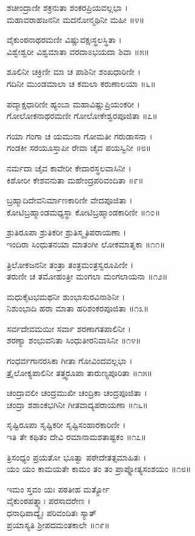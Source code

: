 ಶಚೀಂದ್ರಾಣೀ ಶಕ್ರನುತಾ ಶಂಕರಪ್ರಿಯವಲ್ಲಭಾ ।\\
ಮಹಾವರಾಹಜನನೀ ಮದನೋನ್ಮಥಿನೀ ಮಹೀ ॥೪॥

ವೈಕುಂಠನಾಥರಮಣೀ ವಿಷ್ಣುವಕ್ಷಃಸ್ಥಲಸ್ಥಿತಾ ।\\
ವಿಶ್ವೇಶ್ವರೀ ವಿಶ್ವಮಾತಾ ವರದಾಽಭಯದಾ ಶಿವಾ ॥೫॥

ಶೂಲಿನೀ ಚಕ್ರಿಣೀ ಮಾ ಚ ಪಾಶಿನೀ ಶಂಖಧಾರಿಣೀ ।\\
ಗದಿನೀ ಮುಂಡಮಾಲಾ ಚ ಕಮಲಾ ಕರುಣಾಲಯಾ ॥೬॥

ಪದ್ಮಾಕ್ಷಧಾರಿಣೀ ಹ್ಯಂಬಾ ಮಹಾವಿಷ್ಣುಪ್ರಿಯಂಕರೀ ।\\
ಗೋಲೋಕನಾಥರಮಣೀ ಗೋಲೋಕೇಶ್ವರಪೂಜಿತಾ ॥೭॥

ಗಯಾ ಗಂಗಾ ಚ ಯಮುನಾ ಗೋಮತೀ ಗರುಡಾಸನಾ ।\\
ಗಂಡಕೀ ಸರಯೂಸ್ತಾಪೀ ರೇವಾ ಚೈವ ಪಯಸ್ವಿನೀ ॥೮॥

ನರ್ಮದಾ ಚೈವ ಕಾವೇರೀ ಕೇದಾರಸ್ಥಲವಾಸಿನೀ ।\\
ಕಿಶೋರೀ ಕೇಶವನುತಾ ಮಹೇಂದ್ರಪರಿವಂದಿತಾ ॥೯॥

ಬ್ರಹ್ಮಾದಿದೇವನಿರ್ಮಾಣಕಾರಿಣೀ ವೇದಪೂಜಿತಾ ।\\
ಕೋಟಿಬ್ರಹ್ಮಾಂಡಮಧ್ಯಸ್ಥಾ ಕೋಟಿಬ್ರಹ್ಮಾಂಡಕಾರಿಣೀ ॥೧೦॥

ಶ್ರುತಿರೂಪಾ ಶ್ರುತಿಕರೀ ಶ್ರುತಿಸ್ಮೃತಿಪರಾಯಣಾ ।\\
ಇಂದಿರಾ ಸಿಂಧುತನಯಾ ಮಾತಂಗೀ ಲೋಕಮಾತೃಕಾ ॥೧೧॥

ತ್ರಿಲೋಕಜನನೀ ತಂತ್ರಾ ತಂತ್ರಮಂತ್ರಸ್ವರೂಪಿಣೀ ।\\
ತರುಣೀ ಚ ತಮೋಹಂತ್ರೀ ಮಂಗಲಾ ಮಂಗಲಾಯನಾ ॥೧೨॥

ಮಧುಕೈಟಭಮಥನೀ ಶುಂಭಾಸುರವಿನಾಶಿನೀ ।\\
ನಿಶುಂಭಾದಿ ಹರಾ ಮಾತಾ ಹರಿಶಂಕರಪೂಜಿತಾ ॥೧೩॥

ಸರ್ವದೇವಮಯೀ ಸರ್ವಾ ಶರಣಾಗತಪಾಲಿನೀ ।\\
ಶರಣ್ಯಾ ಶಂಭುವನಿತಾ ಸಿಂಧುತೀರನಿವಾಸಿನೀ ॥೧೪॥

ಗಂಧರ್ವಗಾನರಸಿಕಾ ಗೀತಾ ಗೋವಿಂದವಲ್ಲಭಾ ।\\
ತ್ರೈಲೋಕ್ಯಪಾಲಿನೀ ತತ್ತ್ವರೂಪಾ ತಾರುಣ್ಯಪೂರಿತಾ ॥೧೫॥

ಚಂದ್ರಾವಲೀ ಚಂದ್ರಮುಖೀ ಚಂದ್ರಿಕಾ ಚಂದ್ರಪೂಜಿತಾ ।\\
ಚಂದ್ರಾ ಶಶಾಂಕಭಗಿನೀ ಗೀತವಾದ್ಯಪರಾಯಣಾ ॥೧೬॥

ಸೃಷ್ಟಿರೂಪಾ ಸೃಷ್ಟಿಕರೀ ಸೃಷ್ಟಿಸಂಹಾರಕಾರಿಣೀ ।\\
ಇತಿ ತೇ ಕಥಿತಂ ದೇವಿ ರಮಾನಾಮಶತಾಷ್ಟಕಂ ॥೧೭॥

ತ್ರಿಸಂಧ್ಯಂ ಪ್ರಯತೋ ಭೂತ್ವಾ ಪಠೇದೇತತ್ಸಮಾಹಿತಃ ।\\
ಯಂ ಯಂ ಕಾಮಯತೇ ಕಾಮಂ ತಂ ತಂ ಪ್ರಾಪ್ನೋತ್ಯಸಂಶಯಂ ॥೧೮॥

ಇಮಂ ಸ್ತವಂ ಯಃ ಪಠತೀಹ ಮರ್ತ್ಯೋ\\ ವೈಕುಂಠಪತ್ನ್ಯಾಃ ಪರಸಾದರೇಣ ।\\
ಧನಾಧಿಪಾದ್ಯೈಃ ಪರಿವಂದಿತಃ ಸ್ಯಾತ್\\ ಪ್ರಯಾಸ್ಯತಿ ಶ್ರೀಪದಮಂತಕಾಲೇ ॥೧೯॥

